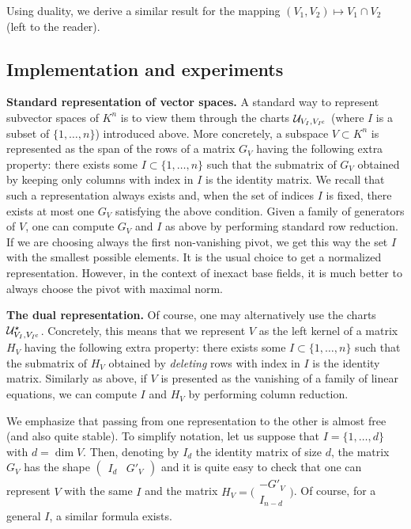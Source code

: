 \documentclass{sig-alternate}
\renewcommand{\c}{\text{\rm c}}
\begin{document}
Using duality, we derive a similar result for the mapping 
$(V_1, V_2) \mapsto V_1 \cap V_2$ (left to the reader).

\subsection{Implementation and experiments}

\noindent
{\bf Standard representation of vector spaces.}
A standard way to represent subvector spaces of $K^n$ is to view them 
through the charts $\mathcal U_{V_I, V_{I^\c}}$ (where $I$ is a subset 
of $\{1, \ldots, n\}$) introduced above. More concretely,
a subspace $V \subset K^n$ is represented as the span of the rows
of a matrix $G_V$ having the following extra property: there 
exists some $I \subset \{1, \ldots, n\}$ such that the submatrix of 
$G_V$ obtained by keeping only columns with index in $I$ is the identity 
matrix. We recall that such a representation always exists and, when 
the set of indices $I$ is fixed, there 
exists at most one $G_V$ satisfying the above condition.
Given a family of generators of $V$, one can compute $G_V$ and $I$ as 
above by performing standard row reduction. If we are choosing always the 
first non-vanishing pivot, we get this way the set $I$ with the smallest 
possible elements. It is the usual choice to get a normalized 
representation. However, in the context of inexact base fields, it is 
much better to always choose the pivot with maximal norm.

\smallskip

\noindent
{\bf The dual representation.}
Of course, one may alternatively use the charts $\mathcal U^\star_{V_I, 
V_{I^\c}}$. Concretely, this means that we represent $V$ as the left 
kernel of a matrix $H_V$ having the following extra property: there 
exists some $I \subset \{1, \ldots, n\}$ such that the submatrix of 
$H_V$ obtained by \emph{deleting} rows with index in $I$ is the identity 
matrix. Similarly as above, if $V$ is presented as the vanishing of a 
family of linear equations, we can compute $I$ and $H_V$ by performing 
column reduction.

We emphasize that passing from one representation to the other is almost 
free (and also quite stable). To simplify notation, let us suppose 
that $I = \{1, \ldots, d\}$ with $d = \dim V$. Then, denoting by $I_d$ 
the identity matrix of size $d$, the matrix $G_V$ has the shape
$(\begin{matrix} I_d & G'_V \end{matrix})$
and it is quite easy to check that one can represent $V$ with the same
$I$ and the matrix
$H_V = \Big(\begin{matrix} -G'_V \\ I_{n-d} \end{matrix}\Big)$. Of
course, for a general $I$, a similar formula exists.
\end{document}
